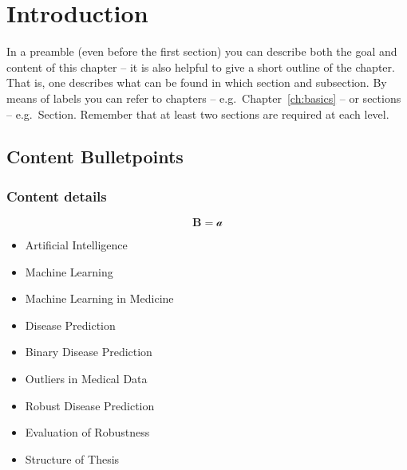 \chapter{Introduction}
\label{ch:introduction} %

In a preamble (even before the first section) you can describe both the goal and content of this chapter -- it is also helpful to give a short outline of the chapter. That is, one describes what can be found in which section and subsection. By means of labels you can refer to chapters -- e.g.~Chapter~\ref{ch:basics} -- or sections -- e.g.~Section. Remember that at least two sections are required at each level. 

\section{Content Bulletpoints}
\subsection{Content details}


\begin{equation}
    \mathbf{B}=\mathcal{a}
\end{equation}

\begin{itemize}
    \item Artificial Intelligence
    \item Machine Learning
    \item Machine Learning in Medicine
    \item Disease Prediction
    \item Binary Disease Prediction
    \item Outliers in Medical Data
    \item Robust Disease Prediction
    \item Evaluation of Robustness
    \item Structure of Thesis
\end{itemize}



